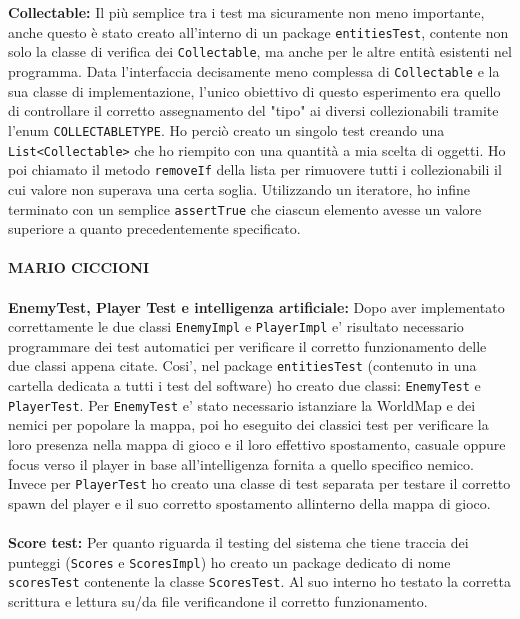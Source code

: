 \documentclass[a4paper,12pt]{report}
\begin{document}
\\ \\
\textbf{Collectable: }
Il più semplice tra i test ma sicuramente non meno importante, anche questo è stato creato all'interno di un package \verb|entitiesTest|, contente non solo la classe di verifica dei \verb|Collectable|, ma anche per le altre entità esistenti nel programma. Data l'interfaccia decisamente meno complessa di \verb|Collectable| e la sua classe di implementazione, l'unico obiettivo di questo esperimento era quello di controllare il corretto assegnamento del "tipo" ai diversi collezionabili tramite l'enum \verb|COLLECTABLETYPE|. Ho perciò creato un singolo test creando una \verb|List<Collectable>| che ho riempito con una quantità a mia scelta di oggetti. Ho poi chiamato il metodo \verb|removeIf| della lista per rimuovere tutti i collezionabili il cui valore non superava una certa soglia. Utilizzando un iteratore, ho infine terminato con un semplice \verb|assertTrue| che ciascun elemento avesse un valore superiore a quanto precedentemente specificato.
\\ \\
\textbf{MARIO CICCIONI}
\\ \\
\textbf{EnemyTest, Player Test e intelligenza artificiale: }
Dopo aver implementato correttamente le due classi \verb|EnemyImpl| e \verb|PlayerImpl| e' risultato necessario programmare dei test automatici per verificare il corretto funzionamento delle due classi appena citate. Cosi', nel package \verb|entitiesTest| (contenuto in una cartella dedicata a tutti i test del software) ho creato due classi: \verb|EnemyTest| e \verb|PlayerTest|. Per \verb|EnemyTest| e' stato necessario istanziare la WorldMap e dei nemici per popolare la mappa, poi ho eseguito dei classici test per verificare la loro presenza nella mappa di gioco e il loro effettivo spostamento, casuale oppure focus verso il player in base all'intelligenza fornita a quello specifico nemico. Invece per \verb|PlayerTest| ho creato una classe di test separata per testare il corretto spawn del player e il suo corretto spostamento allinterno della mappa di gioco.
\\ \\
\textbf{Score test: }
Per quanto riguarda il testing del sistema che tiene traccia dei punteggi (\verb|Scores| e \verb|ScoresImpl|) ho creato un package dedicato di nome \verb|scoresTest| contenente la classe \verb|ScoresTest|. Al suo interno ho testato la corretta scrittura e lettura su/da file verificandone il corretto funzionamento.
\end{document}

